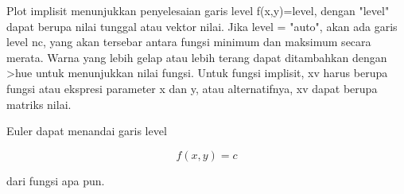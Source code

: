 \begin{eulernotebook}
\begin{eulercomment}
Plot implisit menunjukkan penyelesaian garis level f(x,y)=level,
dengan "level" dapat berupa nilai tunggal atau vektor nilai. Jika
level = "auto", akan ada garis level nc, yang akan tersebar antara
fungsi minimum dan maksimum secara merata. Warna yang lebih gelap atau
lebih terang dapat ditambahkan dengan \textgreater{}hue untuk menunjukkan nilai
fungsi. Untuk fungsi implisit, xv harus berupa fungsi atau ekspresi
parameter x dan y, atau alternatifnya, xv dapat berupa matriks nilai.

Euler dapat menandai garis level

\end{eulercomment}
\begin{eulerformula}
\[
f(x,y) = c
\]
\end{eulerformula}
\begin{eulercomment}
dari fungsi apa pun.


\end{eulercomment}
\end{eulernotebook}

